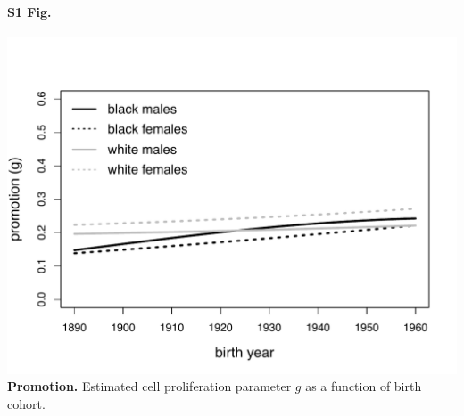 \documentclass[10pt,letterpaper]{article}
\begin{document}
\paragraph*{\Large{S1 Fig.}}
\label{S1_Fig}
\includegraphics[scale=0.7, trim=0 0 0 0]{S1 Fig.pdf}
{\bf Promotion.} Estimated cell proliferation parameter $g$ as a function of birth cohort.
\end{document}
